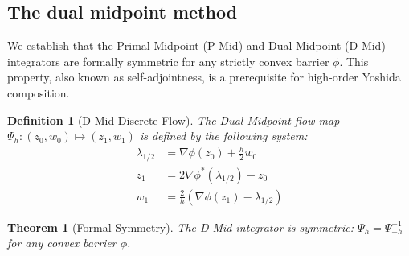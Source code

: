 \documentclass[11pt,a4paper]{article}
\newtheorem{theorem}{Theorem}
\newtheorem{definition}{Definition}
\begin{document}
\subsection{The dual midpoint method}

We establish that the Primal Midpoint (P-Mid) and Dual Midpoint (D-Mid) integrators are formally symmetric for any strictly convex barrier $\phi$. This property, also known as self-adjointness, is a prerequisite for high-order Yoshida composition.

\begin{definition}[D-Mid Discrete Flow]
The Dual Midpoint flow map $\Psi_h: (z_0, w_0) \mapsto (z_1, w_1)$ is defined by the following system:
\begin{align}
    \lambda_{1/2} &= \nabla \phi(z_0) + \frac{h}{2}w_0 \\
    z_1 &= 2\nabla \phi^*(\lambda_{1/2}) - z_0 \\
    w_1 &= \frac{2}{h}(\nabla \phi(z_1) - \lambda_{1/2})
\end{align}
\end{definition}

\begin{theorem}[Formal Symmetry]
The D-Mid integrator is symmetric: $\Psi_h = \Psi_{-h}^{-1}$ for any convex barrier $\phi$.
\end{theorem}
\end{document}
